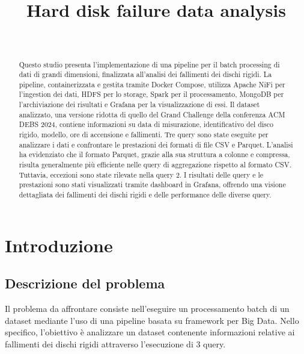 \documentclass[conference]{IEEEtran}
\begin{document}
\title{Hard disk failure data analysis\\}

\author{
\and
{}
\\
}


\maketitle
\thispagestyle{plain}
\pagestyle{plain}

\begin{abstract}
    Questo studio presenta l'implementazione di una pipeline per il batch processing di dati di grandi dimensioni, finalizzata all'analisi dei fallimenti dei dischi rigidi. La pipeline, containerizzata e gestita tramite Docker Compose, utilizza Apache NiFi per l'ingestion dei dati, HDFS per lo storage, Spark per il processamento, MongoDB per l'archiviazione dei risultati e Grafana per la visualizzazione di essi. Il dataset analizzato, una versione ridotta di quello del Grand Challenge della conferenza ACM DEBS 2024, contiene informazioni su data di misurazione, identificativo del disco rigido, modello, ore di accensione e fallimenti. Tre query sono state eseguite per analizzare i dati e confrontare le prestazioni dei formati di file CSV e Parquet. L'analisi ha evidenziato che il formato Parquet, grazie alla sua struttura a colonne e compressa, risulta generalmente più efficiente nelle query di aggregazione rispetto al formato CSV. Tuttavia, eccezioni sono state rilevate nella query 2. I risultati delle query e le prestazioni sono stati visualizzati tramite dashboard in Grafana, offrendo una visione dettagliata dei fallimenti dei dischi rigidi e delle performance delle diverse query.
\end{abstract}

\section{Introduzione}
\subsection{Descrizione del problema}
Il problema da affrontare consiste nell'eseguire un processamento batch di un dataset mediante l'uso di una pipeline basata su framework per Big Data. Nello specifico, l'obiettivo è analizzare un dataset contenente informazioni relative ai fallimenti dei dischi rigidi attraverso l'esecuzione di 3 query.
\end{document}
